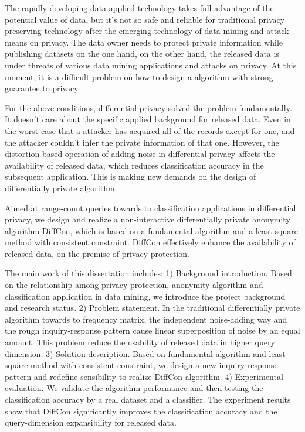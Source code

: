 \begin{englishabstract}

The rapidly developing data applied technology takes full advantage of the potential value of data, but it's not so safe and reliable for traditional privacy preserving technology after the emerging technology of data mining and attack means on privacy. The data owner needs to protect private information while publishing datasets on the one hand, on the other hand, the released data is under threats of various data mining applications and attacks on privacy. At this moment, it is a difficult problem on how to design a algorithm with strong guarantee to privacy.

For the above conditions, differential privacy solved the problem fundamentally.　It doesn't care about the specific applied background for released data. Even in the worst case that a attacker has acquired all of the records except for one, and the attacker couldn't infer the private information of that one. However, the distortion-based operation of adding noise in differential privacy affects the availability of released data, which reduces classification accuracy in the subsequent application. This is making new demands on the design of differentially private algorithm.

Aimed at range-count queries towards to classification applications in differential privacy, we design and realize a non-interactive differentially private anonymity algorithm DiffCon, which is based on a fundamental algorithm and a least square method with consistent constraint. DiffCon effectively enhance  the availability of released data, on the premise of privacy protection.

The main work of this dissertation includes:
1) Background introduction. Based on the relationship among privacy protection, anonymity algorithm and classification application in data mining, we introduce the project background and research status.
2) Problem statement. In the traditional differentially private algorithm towards to frequency matrix, the independent noise-adding way and the rough inquiry-response pattern cause linear superposition of noise by an equal amount. This problem reduce the usability of released data in higher query  dimension.
3) Solution description. Based on fundamental algorithm and least square method with consistent constraint, we design a new inquiry-response pattern and redefine sensibility to realize DiffCon algorithm.
4) Experimental evaluation. We validate the algorithm performance and then testing the classification accuracy by a real dataset and a classifier. The experiment results show that DiffCon significantly improves the classification accuracy and the query-dimension expansibility for released data.


\end{englishabstract}

